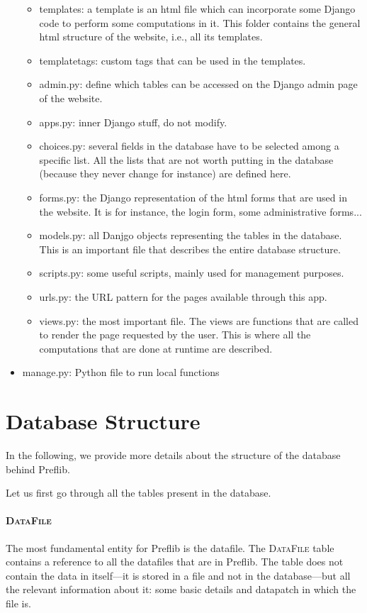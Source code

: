 \documentclass{article}
\begin{document}
\begin{itemize}
\begin{itemize}
			\item templates: a template is an html file which can incorporate some Django code to perform some computations in it. This folder contains the general html structure of the website, i.e., all its templates.
			\item templatetags: custom tags that can be used in the templates.
			\item admin.py: define which tables can be accessed on the Django admin page of the website.
			\item apps.py: inner Django stuff, do not modify.
			\item choices.py: several fields in the database have to be selected among a specific list. All the lists that are not worth putting in the database (because they never change for instance) are defined here.
			\item forms.py: the Django representation of the html forms that are used in the website. It is for instance, the login form, some administrative forms...
			\item models.py: all Danjgo objects representing the tables in the database. This is an important file that describes the entire database structure.
			\item scripts.py: some useful scripts, mainly used for management purposes.
			\item urls.py: the URL pattern for the pages available through this app.
			\item views.py: the most important file. The views are functions that are called to render the page requested by the user. This is where all the computations that are done at runtime are described.
		\end{itemize}
		\item manage.py: Python file to run local functions
	\end{itemize}
	
	\section{Database Structure}
	
	In the following, we provide more details about the structure of the database behind Preflib.
	
	\medskip
	
	Let us first go through all the tables present in the database.
	
	\paragraph{\textsc{DataFile}} The most fundamental entity for Preflib is the datafile. The \textsc{DataFile} table contains a reference to all the datafiles that are in Preflib. The table does not contain the data in itself---it is stored in a file and not in the database---but all the relevant information about it: some basic details and datapatch in which the file is.
	
\end{document}
